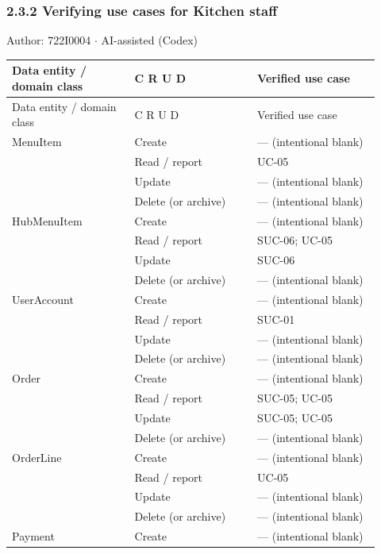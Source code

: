 \subsubsection*{2.3.2 Verifying use cases for Kitchen staff}
Author: 722I0004 \ensuremath{\cdot} AI-assisted (Codex)

\begin{longtable}{>{\raggedright\arraybackslash}p{0.3067\linewidth}>{\raggedright\arraybackslash}p{0.3067\linewidth}>{\raggedright\arraybackslash}p{0.3067\linewidth}}
Data entity / domain class & C R U D & Verified use case \\
\hline\endfirsthead
Data entity / domain class & C R U D & Verified use case \\
\hline\endhead
MenuItem & Create & --- (intentional blank) \\
 & Read / report & UC-05 \\
 & Update & --- (intentional blank) \\
 & Delete (or archive) & --- (intentional blank) \\
HubMenuItem & Create & --- (intentional blank) \\
 & Read / report & SUC-06; UC-05 \\
 & Update & SUC-06 \\
 & Delete (or archive) & --- (intentional blank) \\
UserAccount & Create & --- (intentional blank) \\
 & Read / report & SUC-01 \\
 & Update & --- (intentional blank) \\
 & Delete (or archive) & --- (intentional blank) \\
Order & Create & --- (intentional blank) \\
 & Read / report & SUC-05; UC-05 \\
 & Update & SUC-05; UC-05 \\
 & Delete (or archive) & --- (intentional blank) \\
OrderLine & Create & --- (intentional blank) \\
 & Read / report & UC-05 \\
 & Update & --- (intentional blank) \\
 & Delete (or archive) & --- (intentional blank) \\
Payment & Create & --- (intentional blank) \\

\end{longtable}
